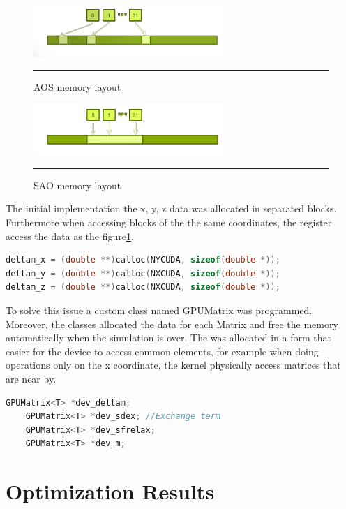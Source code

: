 \begin{figure}[htbp]
	\centering
		\includegraphics[width=0.65\textwidth]{Figures/aos.png}
		\rule{35em}{0.2pt}
	\caption[Array of structures (AOS)]{AOS memory layout }
	\label{fig:aos}
\end{figure}


\begin{figure}[htbp]
	\centering
		\includegraphics[width=0.65\textwidth]{Figures/soa.png}
		\rule{35em}{0.2pt}
	\caption[Structure of Arrays (SAO)]{SAO memory layout}
	\label{fig:sao}
\end{figure}


The initial implementation the  x, y, z data was allocated in separated blocks. Furthermore when accessing blocks of the the same coordinates, the register access the data as the figure\ref{fig:aos}.

\begin{lstlisting}[language=C++, caption={AOS implementation}]
deltam_x = (double **)calloc(NYCUDA, sizeof(double *));
deltam_y = (double **)calloc(NXCUDA, sizeof(double *));
deltam_z = (double **)calloc(NXCUDA, sizeof(double *));
\end{lstlisting}

To solve this issue a custom class named GPUMatrix was programmed. Moreover, the classes allocated the data for each Matrix and free the memory automatically when the simulation is over. The was allocated in a form that easier for the device to access common elements, for example when doing operations only on the x coordinate, the kernel physically access matrices that are near by.

\begin{lstlisting}[language=C++, caption={SOA implementation}]
    GPUMatrix<T> *dev_deltam;
    GPUMatrix<T> *dev_sdex; //Exchange term
    GPUMatrix<T> *dev_sfrelax;
    GPUMatrix<T> *dev_m; 
\end{lstlisting}


\section{Optimization Results}

